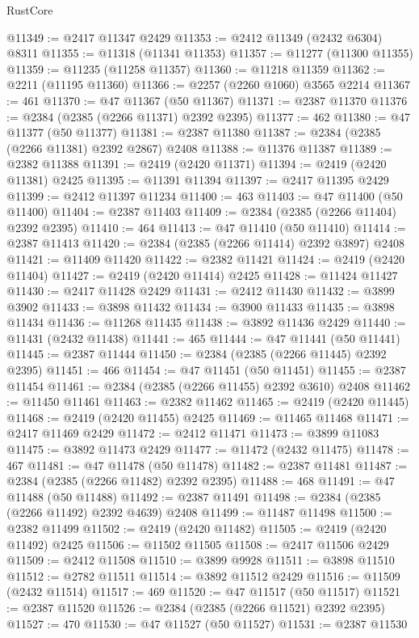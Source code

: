 \begin{lexlean}{RustCore}
\begin{coremodule}
@11349 := @2417 @11347 @2429
@11353 := @2412 @11349 (@2432 @6304) @8311
@11355 := @11318 (@11341 @11353)
@11357 := @11277 (@11300 @11355)
@11359 := @11235 (@11258 @11357)
@11360 := @11218 @11359
@11362 := @2211 (@11195 @11360)
@11366 := @2257 (@2260 @1060) @3565 @2214
@11367 := 461
@11370 := @47 @11367 (@50 @11367)
@11371 := @2387 @11370
@11376 := @2384 (@2385 (@2266 @11371) @2392 @2395)
@11377 := 462
@11380 := @47 @11377 (@50 @11377)
@11381 := @2387 @11380
@11387 := @2384 (@2385 (@2266 @11381) @2392 @2867) @2408
@11388 := @11376 @11387
@11389 := @2382 @11388
@11391 := @2419 (@2420 @11371)
@11394 := @2419 (@2420 @11381) @2425
@11395 := @11391 @11394
@11397 := @2417 @11395 @2429
@11399 := @2412 @11397 @11234
@11400 := 463
@11403 := @47 @11400 (@50 @11400)
@11404 := @2387 @11403
@11409 := @2384 (@2385 (@2266 @11404) @2392 @2395)
@11410 := 464
@11413 := @47 @11410 (@50 @11410)
@11414 := @2387 @11413
@11420 := @2384 (@2385 (@2266 @11414) @2392 @3897) @2408
@11421 := @11409 @11420
@11422 := @2382 @11421
@11424 := @2419 (@2420 @11404)
@11427 := @2419 (@2420 @11414) @2425
@11428 := @11424 @11427
@11430 := @2417 @11428 @2429
@11431 := @2412 @11430
@11432 := @3899 @3902
@11433 := @3898 @11432
@11434 := @3900 @11433
@11435 := @3898 @11434
@11436 := @11268 @11435
@11438 := @3892 @11436 @2429
@11440 := @11431 (@2432 @11438)
@11441 := 465
@11444 := @47 @11441 (@50 @11441)
@11445 := @2387 @11444
@11450 := @2384 (@2385 (@2266 @11445) @2392 @2395)
@11451 := 466
@11454 := @47 @11451 (@50 @11451)
@11455 := @2387 @11454
@11461 := @2384 (@2385 (@2266 @11455) @2392 @3610) @2408
@11462 := @11450 @11461
@11463 := @2382 @11462
@11465 := @2419 (@2420 @11445)
@11468 := @2419 (@2420 @11455) @2425
@11469 := @11465 @11468
@11471 := @2417 @11469 @2429
@11472 := @2412 @11471
@11473 := @3899 @11083
@11475 := @3892 @11473 @2429
@11477 := @11472 (@2432 @11475)
@11478 := 467
@11481 := @47 @11478 (@50 @11478)
@11482 := @2387 @11481
@11487 := @2384 (@2385 (@2266 @11482) @2392 @2395)
@11488 := 468
@11491 := @47 @11488 (@50 @11488)
@11492 := @2387 @11491
@11498 := @2384 (@2385 (@2266 @11492) @2392 @4639) @2408
@11499 := @11487 @11498
@11500 := @2382 @11499
@11502 := @2419 (@2420 @11482)
@11505 := @2419 (@2420 @11492) @2425
@11506 := @11502 @11505
@11508 := @2417 @11506 @2429
@11509 := @2412 @11508
@11510 := @3899 @9928
@11511 := @3898 @11510
@11512 := @2782 @11511
@11514 := @3892 @11512 @2429
@11516 := @11509 (@2432 @11514)
@11517 := 469
@11520 := @47 @11517 (@50 @11517)
@11521 := @2387 @11520
@11526 := @2384 (@2385 (@2266 @11521) @2392 @2395)
@11527 := 470
@11530 := @47 @11527 (@50 @11527)
@11531 := @2387 @11530

\end{coremodule}
\end{lexlean}
